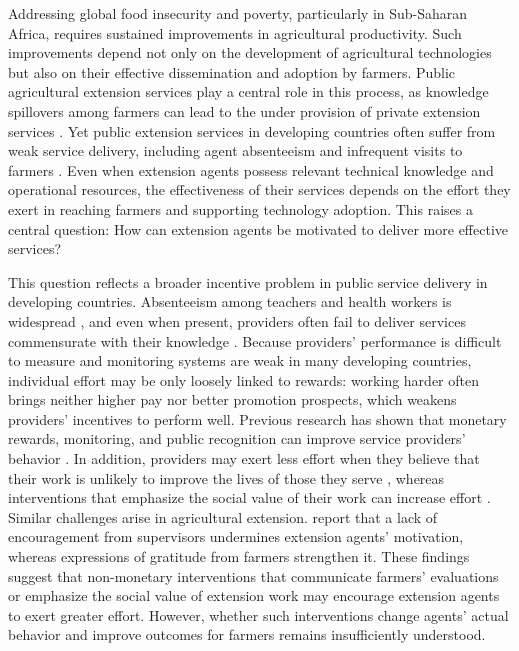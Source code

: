 \documentclass[11pt]{article}
\begin{document}
Addressing global food insecurity and poverty, particularly in Sub-Saharan Africa, requires sustained improvements in agricultural productivity. Such improvements depend not only on the development of agricultural technologies but also on their effective dissemination and adoption by farmers. Public agricultural extension services play a central role in this process, as knowledge spillovers among farmers can lead to the under provision of private extension services \citep{Takahashi2020}. Yet public extension services in developing countries often suffer from weak service delivery, including agent absenteeism and infrequent visits to farmers \citep{Anderson2007, Alam2024}. Even when extension agents possess relevant technical knowledge and operational resources, the effectiveness of their services depends on the effort they exert in reaching farmers and supporting technology adoption. This raises a central question: How can extension agents be motivated to deliver more effective services?

This question reflects a broader incentive problem in public service delivery in developing countries. Absenteeism among teachers and health workers is widespread \citep{Chaudhury2006}, and even when present, providers often fail to deliver services commensurate with their knowledge \citep{Das2007, Finan2017}. Because providers’ performance is difficult to measure and monitoring systems are weak in many developing countries, individual effort may be only loosely linked to rewards: working harder often brings neither higher pay nor better promotion prospects, which weakens providers’ incentives to perform well. Previous research has shown that monetary rewards, monitoring, and public recognition can improve service providers' behavior \citep{Muralidharan2011, Duflo2012, Banerjee2008, Ashraf2014, Leaver2021, Mansuri2023}.  
 In addition, providers may exert less effort when they believe that their work is unlikely to improve the lives of those they serve \citep{Kaur2023}, whereas interventions that emphasize the social value of their work can increase effort \citep{Khan2025}. Similar challenges arise in agricultural extension. \citet{Ragasa2013} report that a lack of encouragement from supervisors undermines extension agents' motivation, whereas expressions of gratitude from farmers strengthen it. These findings suggest that non-monetary interventions that communicate farmers' evaluations or emphasize the social value of extension work may encourage extension agents to exert greater effort. However, whether such interventions change agents' actual behavior and improve outcomes for farmers remains insufficiently understood.
\end{document}
